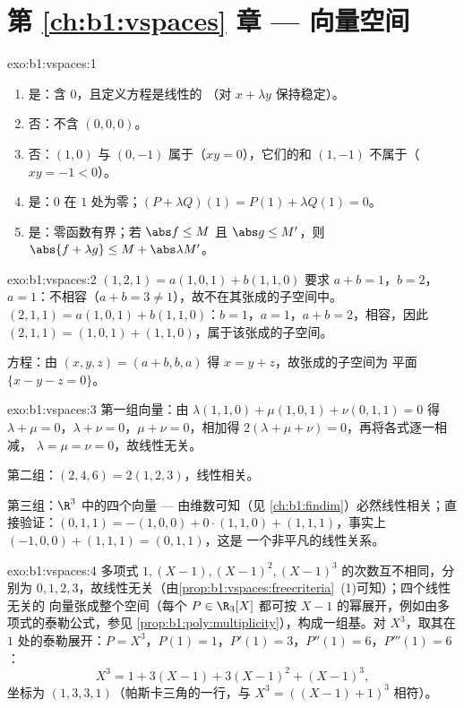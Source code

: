 \section*{第 \ref{ch:b1:vspaces} 章 --- 向量空间}

\begin{solution}{exo:b1:vspaces:1}
\begin{enumerate}
  \item 是：含 $0$，且定义方程是线性的
        （对 $x + \lambda y$ 保持稳定）。
  \item 否：不含 $(0,0,0)$。
  \item 否：$(1, 0)$ 与 $(0, -1)$ 属于（$xy = 0$），它们的和 $(1,
        -1)$ 不属于（$xy = -1 < 0$）。
  \item 是：$0$ 在 $1$ 处为零；$(P + \lambda Q)(1) = P(1) +
        \lambda Q(1) = 0$。
  \item 是：零函数有界；若 $\abs f \leq M$ 且
        $\abs g \leq M'$，则 $\abs{f + \lambda g} \leq M +
        \abs\lambda M'$。
\end{enumerate}
\end{solution}

\begin{solution}{exo:b1:vspaces:2}
$(1,2,1) = a(1,0,1) + b(1,1,0)$ 要求 $a + b = 1$，$b = 2$，$a =
1$：不相容（$a + b = 3 \neq 1$），故不在其张成的子空间中。$(2,1,1) =
a(1,0,1) + b(1,1,0)$：$b = 1$，$a = 1$，$a + b = 2$，相容，因此
$(2,1,1) = (1,0,1) + (1,1,0)$，属于该张成的子空间。

方程：由 $(x, y, z) = (a + b, b, a)$ 得 $x = y + z$，故张成的子空间为
平面 $\{x - y - z = 0\}$。
\end{solution}

\begin{solution}{exo:b1:vspaces:3}
第一组向量：由 $\lambda(1,1,0) + \mu(1,0,1) + \nu(0,1,1) = 0$ 得
$\lambda + \mu = 0$，$\lambda + \nu = 0$，$\mu + \nu = 0$，相加得
$2(\lambda + \mu + \nu) = 0$，再将各式逐一相减，
$\lambda = \mu = \nu = 0$，故线性无关。

第二组：$(2,4,6) = 2(1,2,3)$，线性相关。

第三组：$\R^3$ 中的四个向量 --- 由维数可知（见
\cref{ch:b1:findim}）必然线性相关；直接验证：$(0,1,1) = -(1,0,0) +
0\cdot(1,1,0) + (1,1,1)$，事实上 $(-1,0,0) + (1,1,1) = (0,1,1)$，这是
一个非平凡的线性关系。
\end{solution}

\begin{solution}{exo:b1:vspaces:4}
多项式 $1, (X-1), (X-1)^2, (X-1)^3$ 的次数互不相同，分别为 $0,
1, 2, 3$，故线性无关（由\cref{prop:b1:vspaces:freecriteria}~(1)可知）；四个线性无关的
向量张成整个空间（每个 $P \in \R_3[X]$ 都可按 $X -
1$ 的幂展开，例如由多项式的泰勒公式，参见
\cref{prop:b1:poly:multiplicity}），构成一组基。对 $X^3$，取其在
$1$ 处的泰勒展开：$P = X^3$，$P(1) = 1$，$P'(1) = 3$，$P''(1) = 6$，$P'''(1) =
6$：
\[
X^3 = 1 + 3(X - 1) + 3(X-1)^2 + (X-1)^3 ,
\]
坐标为 $(1, 3, 3, 1)$（帕斯卡三角的一行，与 $X^3 =
((X-1)+1)^3$ 相符）。
\end{solution}

